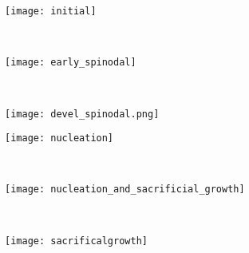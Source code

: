 \begin{figure}
    \centering
    \begin{subfigure}[b]{0.3\textwidth}
        \texttt{[image: initial]}
        \label{fig:initial}
        \caption{}
    \end{subfigure}
    ~
    \begin{subfigure}[b]{0.3\textwidth}
        \texttt{[image: early\_spinodal]}
        \label{fig:early_spinodal}
        \caption{}
    \end{subfigure}
    ~
    \begin{subfigure}[b]{0.3\textwidth}
        \texttt{[image: devel\_spinodal.png]}
        \label{fig:devel_spinodal}
        \caption{}
    \end{subfigure}

    \vspace{0.25cm}
    \begin{subfigure}[b]{0.3\textwidth}
        \texttt{[image: nucleation]}
        \label{fig:nucleation}
        \caption{}
    \end{subfigure}
    ~
    \begin{subfigure}[b]{0.3\textwidth}
        \texttt{[image: nucleation\_and\_sacrificial\_growth]}
        \label{fig:nucleation_and_growth}
        \caption{} 
    \end{subfigure}
    ~
    \begin{subfigure}[b]{0.3\textwidth}
        \texttt{[image: sacrificalgrowth]}
        \label{fig:sacrifical_growth}
        \caption{}
    \end{subfigure}
    

\end{figure}
